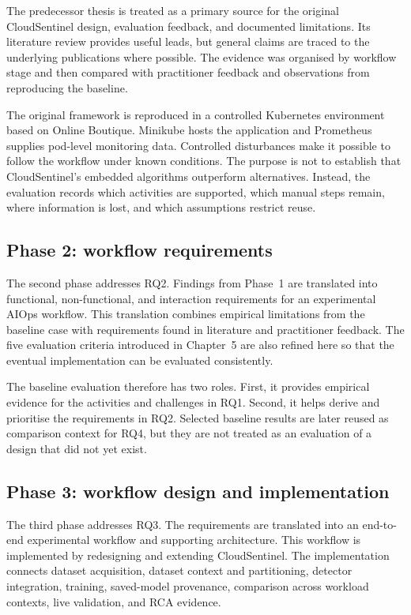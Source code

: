 The predecessor thesis is treated as a primary source for the original CloudSentinel design, evaluation feedback, and documented limitations. Its literature review provides useful leads, but general claims are traced to the underlying publications where possible. The evidence was organised by workflow stage and then compared with practitioner feedback and observations from reproducing the baseline.

The original framework is reproduced in a controlled Kubernetes environment based on Online Boutique. Minikube hosts the application and Prometheus supplies pod-level monitoring data. Controlled disturbances make it possible to follow the workflow under known conditions. The purpose is not to establish that CloudSentinel's embedded algorithms outperform alternatives. Instead, the evaluation records which activities are supported, which manual steps remain, where information is lost, and which assumptions restrict reuse.

\subsection{Phase 2: workflow requirements}

The second phase addresses RQ2. Findings from Phase~1 are translated into functional, non-functional, and interaction requirements for an experimental AIOps workflow. This translation combines empirical limitations from the baseline case with requirements found in literature and practitioner feedback. The five evaluation criteria introduced in Chapter~5 are also refined here so that the eventual implementation can be evaluated consistently.

The baseline evaluation therefore has two roles. First, it provides empirical evidence for the activities and challenges in RQ1. Second, it helps derive and prioritise the requirements in RQ2. Selected baseline results are later reused as comparison context for RQ4, but they are not treated as an evaluation of a design that did not yet exist.

\subsection{Phase 3: workflow design and implementation}

The third phase addresses RQ3. The requirements are translated into an end-to-end experimental workflow and supporting architecture. This workflow is implemented by redesigning and extending CloudSentinel. The implementation connects dataset acquisition, dataset context and partitioning, detector integration, training, saved-model provenance, comparison across workload contexts, live validation, and RCA evidence.

